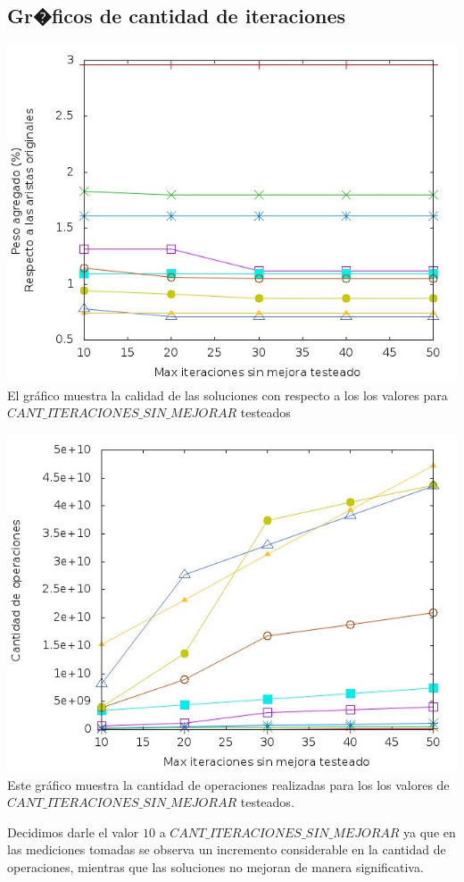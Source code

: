 \documentclass[11pt, a4paper, spanish]{article}
\begin{document}
\newpage
\subsection{Gr�ficos de cantidad de iteraciones}

\begin{center}
\centering \includegraphics[scale=0.40]{img/VariacionItSinMejora.jpg}\\
\small{El gr\'afico muestra la calidad de las soluciones con respecto a los los valores para $CANT\_ITERACIONES\_SIN\_MEJORAR$ testeados}\\
\end{center}
\begin{center}
\centering \includegraphics[scale=0.40]{img/VariacionItSinMejoraComplejidad.jpg}\\
\small{Este gr\'afico muestra la cantidad de operaciones realizadas para los los valores de $CANT\_ITERACIONES\_SIN\_MEJORAR$ testeados.}\\
\end{center}
Decidimos darle el valor $10$ a $CANT\_ITERACIONES\_SIN\_MEJORAR$ ya que en las mediciones tomadas se observa un incremento considerable en la cantidad de operaciones, mientras que las soluciones no mejoran de manera significativa.\\
\end{document}
